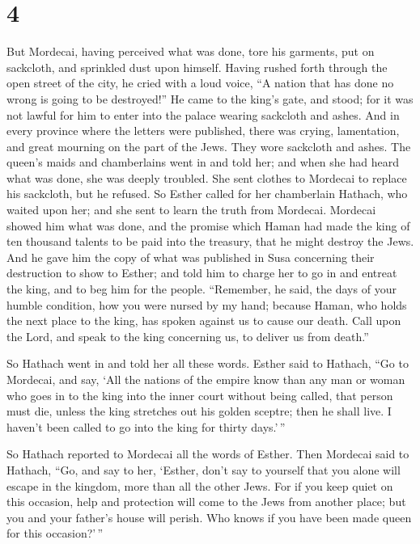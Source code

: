 \hypertarget{section-3}{%
\section{4}\label{section-3}}

 But Mordecai, having perceived what was done, tore his
garments, put on sackcloth, and sprinkled dust upon himself. Having
rushed forth through the open street of the city, he cried with a loud
voice, ``A nation that has done no wrong is going to be destroyed!''
 He came to the king's gate, and stood; for it was not
lawful for him to enter into the palace wearing sackcloth and ashes.
 And in every province where the letters were published,
there was crying, lamentation, and great mourning on the part of the
Jews. They wore sackcloth and ashes.  The queen's maids and
chamberlains went in and told her; and when she had heard what was done,
she was deeply troubled. She sent clothes to Mordecai to replace his
sackcloth, but he refused.  So Esther called for her
chamberlain Hathach, who waited upon her; and she sent to learn the
truth from Mordecai.  Mordecai showed him what was done, and
the promise which Haman had made the king of ten thousand talents to be
paid into the treasury, that he might destroy the Jews.  And
he gave him the copy of what was published in Susa concerning their
destruction to show to Esther; and told him to charge her to go in and
entreat the king, and to beg him for the people. ``Remember, he said,
the days of your humble condition, how you were nursed by my hand;
because Haman, who holds the next place to the king, has spoken against
us to cause our death. Call upon the Lord, and speak to the king
concerning us, to deliver us from death.''

 So Hathach went in and told her all these words.
 Esther said to Hathach, ``Go to Mordecai, and say,
 `All the nations of the empire know than any man or woman
who goes in to the king into the inner court without being called, that
person must die, unless the king stretches out his golden sceptre; then
he shall live. I haven't been called to go into the king for thirty
days.'\,''

 So Hathach reported to Mordecai all the words of Esther.
 Then Mordecai said to Hathach, ``Go, and say to her,
`Esther, don't say to yourself that you alone will escape in the
kingdom, more than all the other Jews.  For if you keep
quiet on this occasion, help and protection will come to the Jews from
another place; but you and your father's house will perish. Who knows if
you have been made queen for this occasion?'\,''


